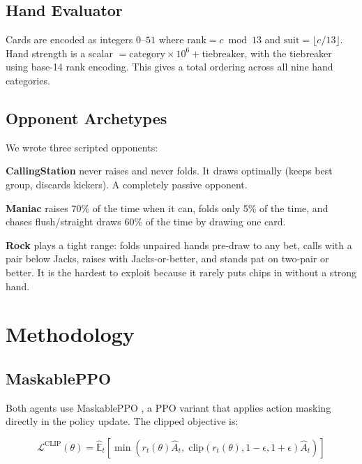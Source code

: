 \documentclass[11pt, conference]{IEEEtran}
\begin{document}
\subsection{Hand Evaluator}

Cards are encoded as integers $0$--$51$ where $\text{rank} = c \bmod 13$
and $\text{suit} = \lfloor c / 13 \rfloor$. Hand strength is a scalar
$= \text{category} \times 10^6 + \text{tiebreaker}$, with the
tiebreaker using base-14 rank encoding. This gives a total ordering
across all nine hand categories.

\subsection{Opponent Archetypes}

We wrote three scripted opponents:

\textbf{CallingStation} never raises and never folds. It draws optimally
(keeps best group, discards kickers). A completely passive opponent.

\textbf{Maniac} raises 70\% of the time when it can, folds only 5\% of
the time, and chases flush/straight draws 60\% of the time by drawing
one card.

\textbf{Rock} plays a tight range: folds unpaired hands pre-draw to any
bet, calls with a pair below Jacks, raises with Jacks-or-better, and
stands pat on two-pair or better. It is the hardest to exploit because
it rarely puts chips in without a strong hand.

\section{Methodology}
\label{sec:method}

\subsection{MaskablePPO}

Both agents use MaskablePPO \cite{raffin2021stable}, a PPO variant that
applies action masking directly in the policy update. The clipped
objective is:

\begin{equation}
\mathcal{L}^{\text{CLIP}}(\theta) = \hat{\mathbb{E}}_t \left[
  \min\!\left( r_t(\theta)\hat{A}_t,\;
  \text{clip}(r_t(\theta), 1-\epsilon, 1+\epsilon)\hat{A}_t \right)
\right]
\label{eq:ppo}
\end{equation}
\end{document}
